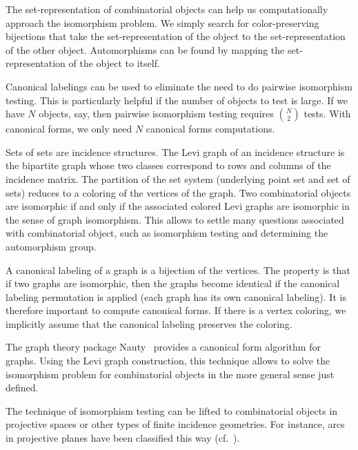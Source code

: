 \bigskip

The set-representation of combinatorial objects can help us computationally approach the isomorphism problem. 
We simply search for color-preserving bijections that take the set-representation of the object to 
the set-representation of the other object. Automorphisms can be found by mapping 
the set-representation of the object to itself.


\bigskip

Canonical labelings can be used to eliminate the need to do pairwise isomorphism testing. 
This is particularly helpful if the number of objects to test is large. 
If we have $N$ objects, say,  then pairwise isomorphism testing requires ${N\choose 2}$ tests. 
With canonical forms, we only need $N$ canonical forms computations.

\bigskip


Sets of sets are incidence structures.
The Levi graph of an incidence structure is the bipartite graph 
whose two classes correspond to rows and columns 
of the incidence matrix. The partition of the set system (underlying point set and set of sets) 
reduces to a coloring of the vertices of the graph.
Two combinatorial objects are isomorphic if and only if the associated colored 
Levi graphs are isomorphic in the sense of graph isomorphism. 
This allows to settle many questions associated with combinatorial object, such as 
isomorphism testing and determining the automorphism group.

\bigskip

A canonical labeling of a graph is a bijection of the vertices. 
The property is that if two graphs are isomorphic, then the 
graphs become identical if the canonical labeling permutation is applied 
(each graph has its own canonical labeling). 
It is therefore important to compute canonical forms.
If there is a vertex coloring, 
we implicitly assume that the canonical labeling preserves the coloring.

\bigskip

The graph theory package Nauty~\cite{Nauty2020} provides a canonical form algorithm for graphs. 
Using the Levi graph construction, this technique allows to solve the isomorphism problem for 
combinatorial objects in the more general sense just defined.

\bigskip


The technique of isomorphism testing can be lifted to combinatorial objects in projective spaces 
or other types of finite incidence geometries. 
For instance, arcs in projective planes have been 
classified this way (cf.~\cite{AlogaidiBetten}).

